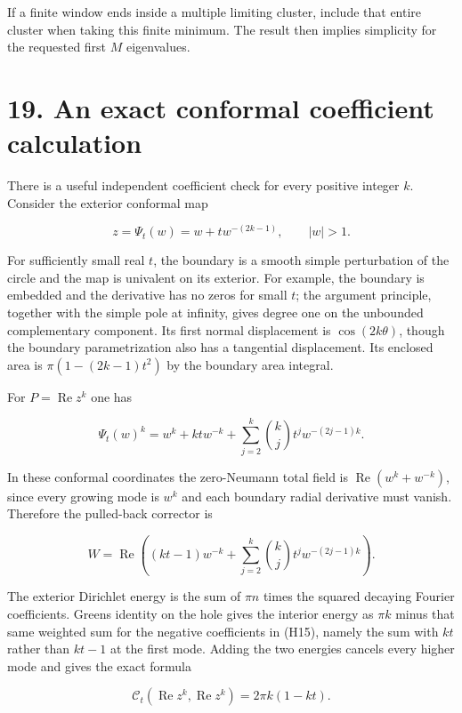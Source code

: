 \documentclass[11pt]{article}
\begin{document}
If a finite window ends inside a multiple limiting cluster, include that
entire cluster when taking this finite minimum. The result then implies
simplicity for the requested first \(M\) eigenvalues.

\section{19. An exact conformal coefficient
calculation}\label{an-exact-conformal-coefficient-calculation}

There is a useful independent coefficient check for every positive
integer \(k\). Consider the exterior conformal map

\[
 z=\Psi_t(w)=w+t w^{-(2k-1)},\qquad |w|>1.
 \tag{H14}
\]

For sufficiently small real \(t\), the boundary is a smooth simple
perturbation of the circle and the map is univalent on its exterior. For
example, the boundary is embedded and the derivative has no zeros for
small \(t\); the argument principle, together with the simple pole at
infinity, gives degree one on the unbounded complementary component. Its
first normal displacement is \(\cos(2k\theta)\), though the boundary
parametrization also has a tangential displacement. Its enclosed area is
\(\pi(1-(2k-1)t^2)\) by the boundary area integral.

For \(P=\operatorname{Re}z^k\) one has

\[
 \Psi_t(w)^k=w^k+k t w^{-k}
           +\sum_{j=2}^k\binom{k}{j}t^j w^{-(2j-1)k}.
 \tag{H15}
\]

In these conformal coordinates the zero-Neumann total field is
\(\operatorname{Re}(w^k+w^{-k})\), since every growing mode is \(w^k\)
and each boundary radial derivative must vanish. Therefore the
pulled-back corrector is

\[
 W=\operatorname{Re}\left((kt-1)w^{-k}
           +\sum_{j=2}^k\binom{k}{j}t^j w^{-(2j-1)k}\right).
\]

The exterior Dirichlet energy is the sum of \(\pi n\) times the squared
decaying Fourier coefficients. Green\textquotesingle s identity on the
hole gives the interior energy as \(\pi k\) minus that same weighted sum
for the negative coefficients in (H15), namely the sum with \(kt\)
rather than \(kt-1\) at the first mode. Adding the two energies cancels
every higher mode and gives the exact formula

\[
 \mathcal C_t(\operatorname{Re}z^k,\operatorname{Re}z^k)
       =2\pi k(1-kt).
 \tag{H16}
\]
\end{document}
